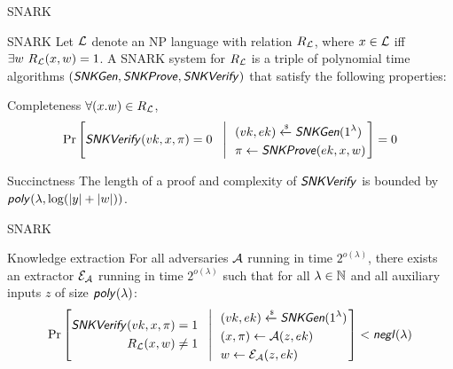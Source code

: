\documentclass[UTF8]{beamer}
\begin{document}
	\begin{frame}{SNARK}
		\begin{block}{SNARK}
			Let $\mathcal{L}$ denote an NP language with relation $R_{\mathcal{L}}$, where $x\in\mathcal{L}$ iff $\exists w~R_{\mathcal{L}}(x,w)=1$. A SNARK system for $R_{\mathcal{L}}$ is a triple of polynomial time algorithms $(\textsf{\textit{SNKGen}},\textsf{\textit{SNKProve}},\textsf{\textit{SNKVerify}})$ that satisfy the following properties:
		\end{block}
		\begin{block}{Completeness}
			$\forall(x.w)\in R_{\mathcal{L}}$,
			\begin{equation*}
				\Pr\left[
				\textsf{\textit{SNKVerify}}(vk,x,\pi)=0
				~~\left|~~
				\begin{aligned}
					&(vk,ek)\xleftarrow{\text{\tiny$\mathsf{\$}$}}\textsf{\textit{SNKGen}}(1^\lambda)\\
					&\pi\gets\textsf{\textit{SNKProve}}(ek,x,w)
				\end{aligned}
				\right.\right]=0
			\end{equation*}
		\end{block}
		\begin{block}{Succinctness}
			The length of a proof and complexity of $\textsf{\textit{SNKVerify}}$ is bounded by $\textsf{\textit{poly}}(\lambda,\log(|y|+|w|))$.
		\end{block}
	\end{frame}

	\begin{frame}{SNARK}
		\begin{block}{Knowledge extraction}
			For all adversaries $\mathcal{A}$ running in time $2^{o(\lambda)}$, there exists an extractor $\mathcal{E}_{\mathcal{A}}$ running in time $2^{o(\lambda)}$ such that for all $\lambda\in\mathbb{N}$ and all auxiliary inputs $z$ of size $\textsf{\textit{poly}}(\lambda)$:
			\begin{equation*}
				\Pr\left[
				\begin{aligned}
					\textsf{\textit{SNKVerify}}(vk,x,\pi)=1\\
					R_{\mathcal{L}}(x,w)\neq1
				\end{aligned}
				~~\left|~~
				\begin{aligned}
					&(vk,ek)\xleftarrow{\text{\tiny$\mathsf{\$}$}}\textsf{\textit{SNKGen}}(1^\lambda)\\
					&(x,\pi)\gets\mathcal{A}(z,ek)\\
					&w\gets\mathcal{E}_{\mathcal{A}}(z,ek)
				\end{aligned}
				\right.\right]<\textsf{\textit{negl}}(\lambda)
			\end{equation*}
		\end{block}
	\end{frame}
\end{document}
